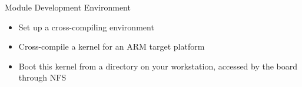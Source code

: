 \setuplabframe
{Module Development Environment}
{
  \begin{itemize}
  \item Set up a cross-compiling environment
  \item Cross-compile a kernel for an ARM target platform
  \item Boot this kernel from a directory on your workstation,
    accessed by the board through NFS
  \end{itemize}
}